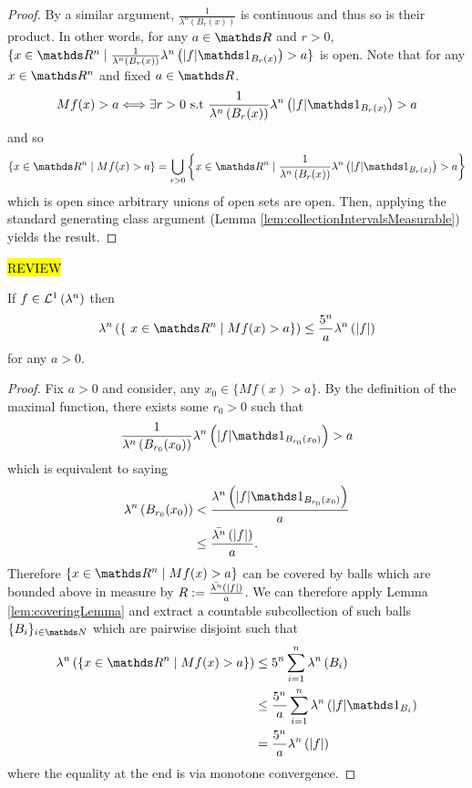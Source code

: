 \begin{proof}
    By a similar argument, $\frac{1}{\lambda^n \left(B_r(x)\right)}$ is continuous and thus so is their product. In other words, for any $a \in \R$ and $r>0$, $\{ x \in \R^n \mid \frac{1}{\lambda^n \left(B_r(x)\right) } \lambda^n \left( \lvert f \rvert \indicate_{B_r(x)} \right)  > a\}$ is open. Note that for any $x \in \R^n$ and fixed $ a \in \R$.
    \[
    	Mf(x) > a \Longleftrightarrow \exists r > 0 \text{ s.t } \frac{1}{\lambda^n \left(B_r(x)\right) } \lambda^n \left( \lvert f \rvert \indicate_{B_r(x)} \right)  > a
    \] and so 
    \[
    	\{ x \in \R^n \mid Mf(x) > a\} = \bigcup_{r > 0}  \left\{x \in \R^n \mid \frac{1}{\lambda^n \left(B_r(x)\right) } \lambda^n \left( \lvert f \rvert \indicate_{B_r(x)} \right)  > a \right\}
    \]
    which is open since arbitrary unions of open sets are open. Then, applying the standard generating class argument (Lemma \ref{lem:collectionIntervalsMeasurable}) yields the result.
\end{proof}


\hl{REVIEW}
\begin{thm}
	\label{thm:hardyLittlewoodWeakInequality} If $f \in \mathcal{L}^{1}\left(\lambda^n\right)$ then 
	\[
		\lambda^n\left( \{\ x \in \R^n \mid Mf(x) > a \}\right) \leq \frac{5^n}{a}\lambda^n\left(\lvert f \rvert\right)
	\]
	for any $a > 0$.
\end{thm}

\begin{proof}
	Fix $a>0$ and consider, any $x_0 \in \{Mf(x) > a\}$. By the definition of the maximal function, there exists some $r_0>0$ such that
	\[
		\frac{1}{\lambda^n\left(B_{r_0}(x_0)\right)}\lambda^n\left(\lvert f \rvert \indicate_{B_{r_0}(x_0)}\right) > a
	\] 
	which is equivalent to saying
	\begin{align*}
		\lambda^n\left( B_{r_0}(x_0)\right) &< \frac{\lambda^n\left( \lvert f\rvert \indicate_{B_{r_0}(x_0)} \right)}{a} \\
		&\leq \frac{\lebInt{\lambda^n}{\lvert f \rvert }}{a}.
	\end{align*}
	Therefore $\{ x \in \R^n \mid Mf(x) > a\}$ can be covered by balls which are bounded above in measure by $R:=\frac{\bar{\lambda^n}\left(\lvert f \rvert \right)}{a}$. We can therefore apply Lemma \ref{lem:coveringLemma} and extract a countable subcollection of such balls $\{B_i\}_{i\in\N}$ which are pairwise disjoint such that
	\begin{align*}
		\lambda^n \left( \{ x \in \R^n \mid Mf(x) > a\} \right) &\leq  5^n \sum_{i=1}^n \lambda^n\left( B_i\right) \\
		&\leq \frac{5^n}{a} \sum_{i=1}^n \lambda^n\left(\lvert f \rvert \indicate_{B_i}\right) \\
		&= \frac{5^n}{a}\lambda^n\left( \lvert f \rvert \right)
	\end{align*}
where the equality at the end is via monotone convergence.
\end{proof}

